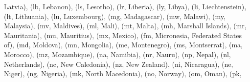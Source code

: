 \documentclass[letterpaper,10pt,english]{sphinxmanual}
\begin{document}
\begin{fulllineitems}
\begin{fulllineitems}
\textquotesingle{}Latvia\textquotesingle{}), (\textquotesingle{}lb\textquotesingle{}, \textquotesingle{}Lebanon\textquotesingle{}), (\textquotesingle{}ls\textquotesingle{}, \textquotesingle{}Lesotho\textquotesingle{}), (\textquotesingle{}lr\textquotesingle{}, \textquotesingle{}Liberia\textquotesingle{}), (\textquotesingle{}ly\textquotesingle{}, \textquotesingle{}Libya\textquotesingle{}), (\textquotesingle{}li\textquotesingle{}, \textquotesingle{}Liechtenstein\textquotesingle{}), (\textquotesingle{}lt\textquotesingle{}, \textquotesingle{}Lithuania\textquotesingle{}), (\textquotesingle{}lu\textquotesingle{}, \textquotesingle{}Luxembourg\textquotesingle{}), (\textquotesingle{}mg\textquotesingle{}, \textquotesingle{}Madagascar\textquotesingle{}), (\textquotesingle{}mw\textquotesingle{}, \textquotesingle{}Malawi\textquotesingle{}), (\textquotesingle{}my\textquotesingle{}, \textquotesingle{}Malaysia\textquotesingle{}), (\textquotesingle{}mv\textquotesingle{}, \textquotesingle{}Maldives\textquotesingle{}), (\textquotesingle{}ml\textquotesingle{}, \textquotesingle{}Mali\textquotesingle{}), (\textquotesingle{}mt\textquotesingle{}, \textquotesingle{}Malta\textquotesingle{}), (\textquotesingle{}mh\textquotesingle{}, \textquotesingle{}Marshall Islands\textquotesingle{}), (\textquotesingle{}mr\textquotesingle{}, \textquotesingle{}Mauritania\textquotesingle{}), (\textquotesingle{}mu\textquotesingle{}, \textquotesingle{}Mauritius\textquotesingle{}), (\textquotesingle{}mx\textquotesingle{}, \textquotesingle{}Mexico\textquotesingle{}), (\textquotesingle{}fm\textquotesingle{}, \textquotesingle{}Micronesia, Federated States of\textquotesingle{}), (\textquotesingle{}md\textquotesingle{}, \textquotesingle{}Moldova\textquotesingle{}), (\textquotesingle{}mn\textquotesingle{}, \textquotesingle{}Mongolia\textquotesingle{}), (\textquotesingle{}me\textquotesingle{}, \textquotesingle{}Montenegro\textquotesingle{}), (\textquotesingle{}ms\textquotesingle{}, \textquotesingle{}Montserrat\textquotesingle{}), (\textquotesingle{}ma\textquotesingle{}, \textquotesingle{}Morocco\textquotesingle{}), (\textquotesingle{}mz\textquotesingle{}, \textquotesingle{}Mozambique\textquotesingle{}), (\textquotesingle{}na\textquotesingle{}, \textquotesingle{}Namibia\textquotesingle{}), (\textquotesingle{}nr\textquotesingle{}, \textquotesingle{}Nauru\textquotesingle{}), (\textquotesingle{}np\textquotesingle{}, \textquotesingle{}Nepal\textquotesingle{}), (\textquotesingle{}nl\textquotesingle{}, \textquotesingle{}Netherlands\textquotesingle{}), (\textquotesingle{}nc\textquotesingle{}, \textquotesingle{}New Caledonia\textquotesingle{}), (\textquotesingle{}nz\textquotesingle{}, \textquotesingle{}New Zealand\textquotesingle{}), (\textquotesingle{}ni\textquotesingle{}, \textquotesingle{}Nicaragua\textquotesingle{}), (\textquotesingle{}ne\textquotesingle{}, \textquotesingle{}Niger\textquotesingle{}), (\textquotesingle{}ng\textquotesingle{}, \textquotesingle{}Nigeria\textquotesingle{}), (\textquotesingle{}mk\textquotesingle{}, \textquotesingle{}North Macedonia\textquotesingle{}), (\textquotesingle{}no\textquotesingle{}, \textquotesingle{}Norway\textquotesingle{}), (\textquotesingle{}om\textquotesingle{}, \textquotesingle{}Oman\textquotesingle{}), (\textquotesingle{}pk\textquotesingle{}, 
\end{fulllineitems}
\end{fulllineitems}
\end{document}
